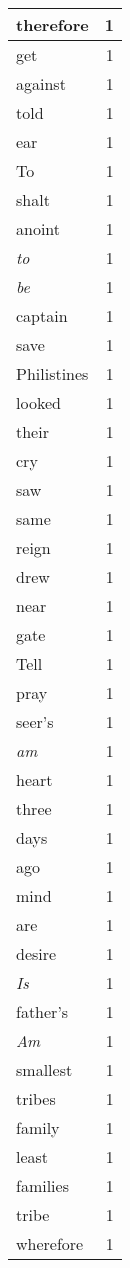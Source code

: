 \begin{center}
\begin{longtable}{l|r}
therefore & 1 \\ \hline
get & 1 \\ \hline
against & 1 \\ \hline
told & 1 \\ \hline
ear & 1 \\ \hline
To & 1 \\ \hline
shalt & 1 \\ \hline
anoint & 1 \\ \hline
\emph{to} & 1 \\ \hline
\emph{be} & 1 \\ \hline
captain & 1 \\ \hline
save & 1 \\ \hline
Philistines & 1 \\ \hline
looked & 1 \\ \hline
their & 1 \\ \hline
cry & 1 \\ \hline
saw & 1 \\ \hline
same & 1 \\ \hline
reign & 1 \\ \hline
drew & 1 \\ \hline
near & 1 \\ \hline
gate & 1 \\ \hline
Tell & 1 \\ \hline
pray & 1 \\ \hline
seer's & 1 \\ \hline
\emph{am} & 1 \\ \hline
heart & 1 \\ \hline
three & 1 \\ \hline
days & 1 \\ \hline
ago & 1 \\ \hline
mind & 1 \\ \hline
are & 1 \\ \hline
desire & 1 \\ \hline
\emph{Is} & 1 \\ \hline
father's & 1 \\ \hline
\emph{Am} & 1 \\ \hline
smallest & 1 \\ \hline
tribes & 1 \\ \hline
family & 1 \\ \hline
least & 1 \\ \hline
families & 1 \\ \hline
tribe & 1 \\ \hline
wherefore & 1 \\ \hline

\end{longtable}
\end{center}
